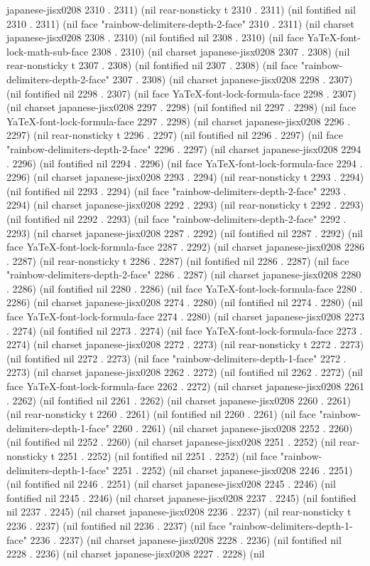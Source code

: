 japanese-jisx0208 2310 . 2311) (nil rear-nonsticky t 2310 . 2311) (nil fontified nil 2310 . 2311) (nil face "rainbow-delimiters-depth-2-face" 2310 . 2311) (nil charset japanese-jisx0208 2308 . 2310) (nil fontified nil 2308 . 2310) (nil face YaTeX-font-lock-math-sub-face 2308 . 2310) (nil charset japanese-jisx0208 2307 . 2308) (nil rear-nonsticky t 2307 . 2308) (nil fontified nil 2307 . 2308) (nil face "rainbow-delimiters-depth-2-face" 2307 . 2308) (nil charset japanese-jisx0208 2298 . 2307) (nil fontified nil 2298 . 2307) (nil face YaTeX-font-lock-formula-face 2298 . 2307) (nil charset japanese-jisx0208 2297 . 2298) (nil fontified nil 2297 . 2298) (nil face YaTeX-font-lock-formula-face 2297 . 2298) (nil charset japanese-jisx0208 2296 . 2297) (nil rear-nonsticky t 2296 . 2297) (nil fontified nil 2296 . 2297) (nil face "rainbow-delimiters-depth-2-face" 2296 . 2297) (nil charset japanese-jisx0208 2294 . 2296) (nil fontified nil 2294 . 2296) (nil face YaTeX-font-lock-formula-face 2294 . 2296) (nil charset japanese-jisx0208 2293 . 2294) (nil rear-nonsticky t 2293 . 2294) (nil fontified nil 2293 . 2294) (nil face "rainbow-delimiters-depth-2-face" 2293 . 2294) (nil charset japanese-jisx0208 2292 . 2293) (nil rear-nonsticky t 2292 . 2293) (nil fontified nil 2292 . 2293) (nil face "rainbow-delimiters-depth-2-face" 2292 . 2293) (nil charset japanese-jisx0208 2287 . 2292) (nil fontified nil 2287 . 2292) (nil face YaTeX-font-lock-formula-face 2287 . 2292) (nil charset japanese-jisx0208 2286 . 2287) (nil rear-nonsticky t 2286 . 2287) (nil fontified nil 2286 . 2287) (nil face "rainbow-delimiters-depth-2-face" 2286 . 2287) (nil charset japanese-jisx0208 2280 . 2286) (nil fontified nil 2280 . 2286) (nil face YaTeX-font-lock-formula-face 2280 . 2286) (nil charset japanese-jisx0208 2274 . 2280) (nil fontified nil 2274 . 2280) (nil face YaTeX-font-lock-formula-face 2274 . 2280) (nil charset japanese-jisx0208 2273 . 2274) (nil fontified nil 2273 . 2274) (nil face YaTeX-font-lock-formula-face 2273 . 2274) (nil charset japanese-jisx0208 2272 . 2273) (nil rear-nonsticky t 2272 . 2273) (nil fontified nil 2272 . 2273) (nil face "rainbow-delimiters-depth-1-face" 2272 . 2273) (nil charset japanese-jisx0208 2262 . 2272) (nil fontified nil 2262 . 2272) (nil face YaTeX-font-lock-formula-face 2262 . 2272) (nil charset japanese-jisx0208 2261 . 2262) (nil fontified nil 2261 . 2262) (nil charset japanese-jisx0208 2260 . 2261) (nil rear-nonsticky t 2260 . 2261) (nil fontified nil 2260 . 2261) (nil face "rainbow-delimiters-depth-1-face" 2260 . 2261) (nil charset japanese-jisx0208 2252 . 2260) (nil fontified nil 2252 . 2260) (nil charset japanese-jisx0208 2251 . 2252) (nil rear-nonsticky t 2251 . 2252) (nil fontified nil 2251 . 2252) (nil face "rainbow-delimiters-depth-1-face" 2251 . 2252) (nil charset japanese-jisx0208 2246 . 2251) (nil fontified nil 2246 . 2251) (nil charset japanese-jisx0208 2245 . 2246) (nil fontified nil 2245 . 2246) (nil charset japanese-jisx0208 2237 . 2245) (nil fontified nil 2237 . 2245) (nil charset japanese-jisx0208 2236 . 2237) (nil rear-nonsticky t 2236 . 2237) (nil fontified nil 2236 . 2237) (nil face "rainbow-delimiters-depth-1-face" 2236 . 2237) (nil charset japanese-jisx0208 2228 . 2236) (nil fontified nil 2228 . 2236) (nil charset japanese-jisx0208 2227 . 2228) (nil 
